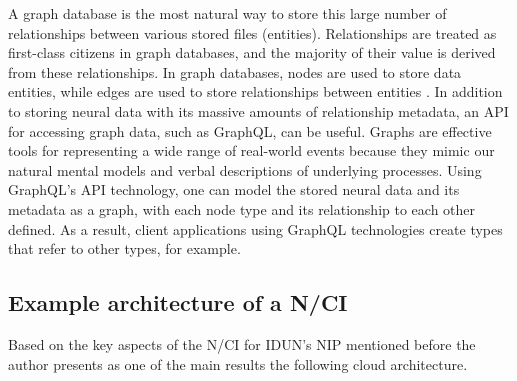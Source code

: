 A graph database is the most natural way to store this large number of relationships between various stored files (entities). Relationships are treated as first-class citizens in graph databases, and the majority of their value is derived from these relationships. In graph databases, nodes are used to store data entities, while edges are used to store relationships between entities \citep{amazon_web_services_inc_what_nodate}. In addition to storing neural data with its massive amounts of relationship metadata, an API for accessing graph data, such as GraphQL, can be useful. Graphs are effective tools for representing a wide range of real-world events because they mimic our natural mental models and verbal descriptions of underlying processes. Using GraphQL's API technology, one can model the stored neural data and its metadata as a graph, with each node type and its relationship to each other defined. As a result, client applications using GraphQL technologies \citep{graphql_thinking_nodate} create types that refer to other types, for example.


\subsection{Example architecture of a N/CI}
\label{chapter5-example-architecture-of-a-nci}

Based on the key aspects of the N/CI for IDUN's NIP mentioned before the author presents as one of the main results the following cloud architecture.






